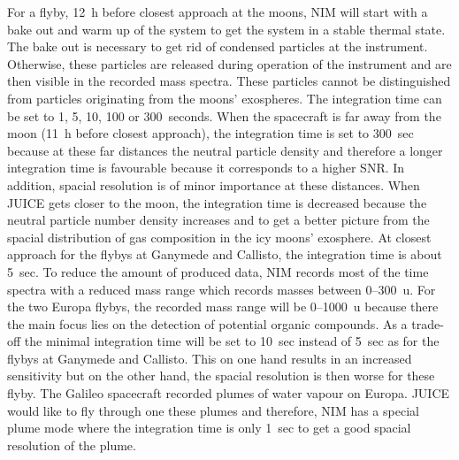	For a flyby, 12~h before closest approach at the moons, NIM will start with a bake out and warm up of the system to get the system in a stable thermal state. The bake out is necessary to get rid of condensed particles at the instrument. Otherwise, these particles are released during operation of the instrument and are then visible in the recorded mass spectra. These particles cannot be distinguished from particles originating from the moons' exospheres. The integration time can be set to 1, 5, 10, 100 or 300~seconds. When the spacecraft is far away from the moon (11~h before closest approach), the integration time is set to 300~sec because at these far distances the neutral particle density and therefore a longer integration time is favourable because it corresponds to a higher SNR. In addition, spacial resolution is of minor importance at these distances. When JUICE gets closer to the moon, the integration time is decreased because the neutral particle number density increases and to get a better picture from the spacial distribution of gas composition in the icy moons' exosphere. At closest approach for the flybys at Ganymede and Callisto, the integration time is about 5~sec. To reduce the amount of produced data, NIM records most of the time spectra with a reduced mass range which records masses between 0--300~u. For the two Europa flybys, the recorded mass range will be 0--1000~u because there the main focus lies on the detection of potential organic compounds. As a trade-off the minimal integration time will be set to 10~sec instead of 5~sec as for the flybys at Ganymede and Callisto. This on one hand results in an increased sensitivity but on the other hand, the spacial resolution is then worse for these flyby. The Galileo spacecraft recorded plumes of water vapour on Europa. JUICE would like to fly through one these plumes and therefore, NIM has a special plume mode where the integration time is only 1~sec to get a good spacial resolution of the plume.
	
	
